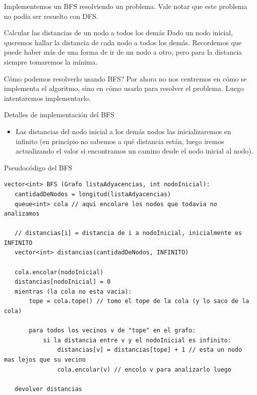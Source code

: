 \documentclass[compress]{beamer}
\begin{document}
\begin{frame}
Implementemos un BFS resolviendo un problema. Vale notar que este problema no podía ser resuelto con DFS.

\begin{block}{Calcular las distancias de un nodo a todos los demás}
Dado un nodo inicial, queremos hallar la distancia de cada nodo a todos los demás. Recordemos que puede haber más de una forma de ir de un nodo a otro, pero para la distancia siempre tomaremos la mínima.
\end{block}

\textquestiondown Cómo podemos resolverlo usando BFS? Por ahora no nos centremos en cómo se implementa el algoritmo, sino en cómo usarlo para resolver el problema. Luego intentaremos implementarlo.
\end{frame}

\begin{frame}{Detalles de implementación del BFS}
\begin{itemize}
\item Las distancias del nodo inicial a los demás nodos las inicializaremos en infinito (en principio no sabemos a qué distancia están, luego iremos actualizando el valor si encontramos un camino desde el nodo inicial al nodo).
\pause
{}
\pause
{}
\end{itemize}
\end{frame}

\begin{frame}[fragile]{Pseudoc\'odigo del BFS}

\begin{lstlisting}
vector<int> BFS (Grafo listaAdyacencias, int nodoInicial):
   cantidadDeNodos = longitud(listaAdyacencias)
   queue<int> cola // aqui encolare los nodos que todavia no analizamos

   // distancias[i] = distancia de i a nodoInicial, inicialmente es INFINITO
   vector<int> distancias(cantidadDeNodos, INFINITO) 

   cola.encolar(nodoInicial)
   distancias[nodoInicial] = 0
   mientras (la cola no esta vacia):
       tope = cola.tope() // tomo el tope de la cola (y lo saco de la cola)

       para todos los vecinos v de "tope" en el grafo:
           si la distancia entre v y el nodoInicial es infinito:
               distancias[v] = distancias[tope] + 1 // esta un nodo mas lejos que su vecino
               cola.encolar(v) // encolo v para analizarlo luego

   devolver distancias
\end{lstlisting}
\end{frame}
\end{document}

